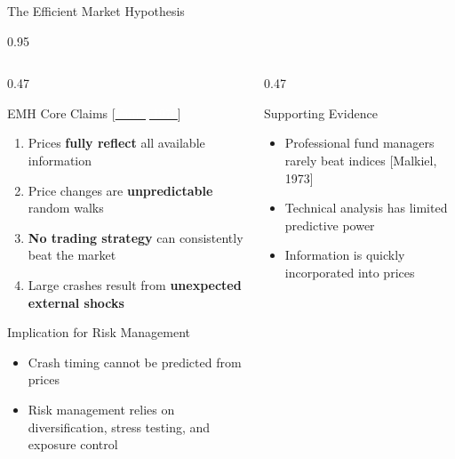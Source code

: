 \documentclass[9pt, aspectratio=169, t]{beamer}
\begin{document}
\begin{frame}{The Efficient Market Hypothesis}
    \begin{cminipage}{0.95\textwidth}
    {\scriptsize
    \begin{columns}[T]
        \begin{column}{0.47\textwidth}
            \begin{block}{EMH Core Claims {\scriptsize[\href{https://doi.org/10.2307/2325486}{\textcolor{white}{Fama, 1970}}]}}
                \begin{enumerate}\setlength{\itemsep}{0pt}
                    \item Prices \textbf{fully reflect} all available information
                    \item Price changes are \textbf{unpredictable} random walks
                    \item \textbf{No trading strategy} can consistently beat the market
                    \item Large crashes result from \textbf{unexpected external shocks}
                \end{enumerate}
            \end{block}
            \vspace{-2mm}
            \begin{alertblock}{Implication for Risk Management}
                \begin{itemize}\setlength{\itemsep}{0pt}
                    \item Crash timing cannot be predicted from prices
                    \item Risk management relies on diversification, stress testing, and exposure control
                \end{itemize}
            \end{alertblock}
        \end{column}
        \begin{column}{0.47\textwidth}
            \begin{exampleblock}{Supporting Evidence}
                \begin{itemize}\setlength{\itemsep}{0pt}
                    \item Professional fund managers rarely beat indices [Malkiel, 1973]
                    \item Technical analysis has limited predictive power
                    \item Information is quickly incorporated into prices
                \end{itemize}

\end{exampleblock}
\end{column}
\end{columns}}
\end{cminipage}
\end{frame}
\end{document}
